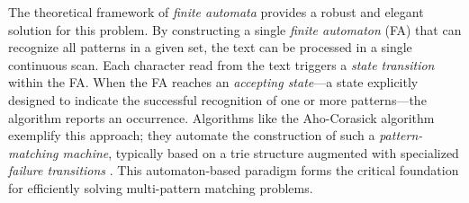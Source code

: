 The theoretical framework of \textit{finite automata} provides a robust and elegant solution for this problem. By constructing a single \textit{finite automaton} (FA) that can recognize all patterns in a given set, the text can be processed in a single continuous scan. Each character read from the text triggers a \textit{state transition} within the FA. When the FA reaches an \textit{accepting state}---a state explicitly designed to indicate the successful recognition of one or more patterns---the algorithm reports an occurrence. Algorithms like the Aho-Corasick algorithm exemplify this approach; they automate the construction of such a \textit{pattern-matching machine}, typically based on a trie structure augmented with specialized \textit{failure transitions} \cite{AhoCorasick1975}. This automaton-based paradigm forms the critical foundation for efficiently solving multi-pattern matching problems.


